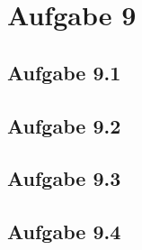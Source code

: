\chapter{Aufgabe 9}
\section{Aufgabe 9.1}
\section{Aufgabe 9.2}
\section{Aufgabe 9.3}
\section{Aufgabe 9.4}